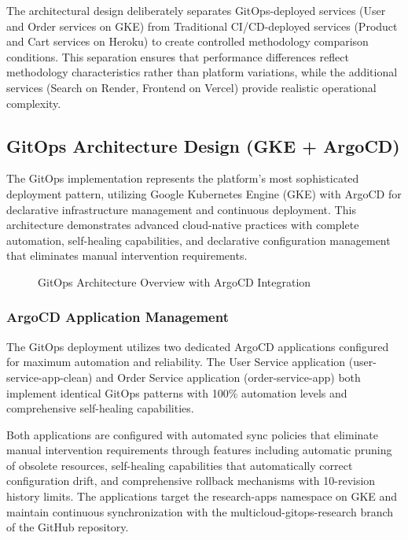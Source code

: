 The architectural design deliberately separates GitOps-deployed services (User and Order services on GKE) from Traditional CI/CD-deployed services (Product and Cart services on Heroku) to create controlled methodology comparison conditions. This separation ensures that performance differences reflect methodology characteristics rather than platform variations, while the additional services (Search on Render, Frontend on Vercel) provide realistic operational complexity.

\subsection{GitOps Architecture Design (GKE + ArgoCD)}

The GitOps implementation represents the platform's most sophisticated deployment pattern, utilizing Google Kubernetes Engine (GKE) with ArgoCD for declarative infrastructure management and continuous deployment. This architecture demonstrates advanced cloud-native practices with complete automation, self-healing capabilities, and declarative configuration management that eliminates manual intervention requirements.

\begin{figure}[H]
\centering
\caption{GitOps Architecture Overview with ArgoCD Integration}
\label{fig:gitops-architecture-overview}
\end{figure}

\subsubsection{ArgoCD Application Management}

The GitOps deployment utilizes two dedicated ArgoCD applications configured for maximum automation and reliability. The User Service application (user-service-app-clean) and Order Service application (order-service-app) both implement identical GitOps patterns with 100\% automation levels and comprehensive self-healing capabilities.

Both applications are configured with automated sync policies that eliminate manual intervention requirements through features including automatic pruning of obsolete resources, self-healing capabilities that automatically correct configuration drift, and comprehensive rollback mechanisms with 10-revision history limits. The applications target the research-apps namespace on GKE and maintain continuous synchronization with the multicloud-gitops-research branch of the GitHub repository.

